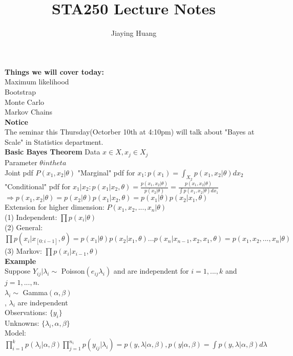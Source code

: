 \documentclass[12pt]{article}
\begin{document}
\title{STA250 Lecture Notes}
\author{Jiaying Huang}
\maketitle

\textbf{Things we will cover today:}\\
Maximum likelihood\\
Bootstrap\\
Monte Carlo\\ 
Markov Chains\\

\textbf{Notice}\\
The seminar this Thursday(Octorber 10th at 4:10pm) will talk about "Bayes at Scale" in Statistics department. \\


\textbf{Basic Bayes Theorem}
Data  $x \in X, x_j \in X_j$\\
Parameter $\theta  in theta$\\
Joint pdf $P(x_1,x_2 | \theta)$
"Marginal" pdf for $x_1: p(x_1)=\int_{X_2}p(x_1,x_2|\theta)dx_2$\\
"Conditional" pdf for $x_1|x_2:  p(x_1|x_2,\theta)=\frac{p(x_1,x_2|\theta)}{p(x_2|\theta)}=\frac{p(x_1,x_2|\theta)}{\int p(x_1,x_2|\theta)dx_1}$\\

$\Rightarrow p(x_1,x_2|\theta)=p(x_2|\theta)p(x_1|x_2,\theta)=p(x_1|\theta)p(x_2|x_1,\theta)$\\

Extension for higher dimension: $P(x_1, x_2,...,x_n|\theta)$\\
(1) Independent: $\prod p(x_i|\theta)$\\
(2) General: $\prod p(x_i|x_{[0:i-1]},\theta)=p(x_1|\theta)p(x_2|x_1,\theta)...p(x_n|x_{n-1},x_2,x_1,\theta)=p(x_1,x_2,...,x_n|\theta)$\\
(3) Markov: $\prod p(x_i|x_{i-1},\theta)$\\

\textbf{Example}\\
Suppose $Y_{ij}|\lambda_i \sim$ Poisson$(e_{ij} \lambda_i)$ and are independent for $i=1,..., k$ and $j=1,...,n$.\\
$\lambda_i \sim$ Gamma$(\alpha,\beta)$\\, $\lambda_i$ are independent\\
Observations: $\{y_i\}$\\
Unknowns: $\{\lambda_i, \alpha,\beta\}$\\
Model: $\prod_{i=1}^k p(\lambda_i|\alpha,\beta) \prod_{j=1}^{n_i} p(y_{ij}|\lambda_i)=p(y,\lambda|\alpha,\beta), 
p(y|\alpha,\beta)=\int p(y,\lambda|\alpha,\beta)d\lambda$\\
\end{document}
